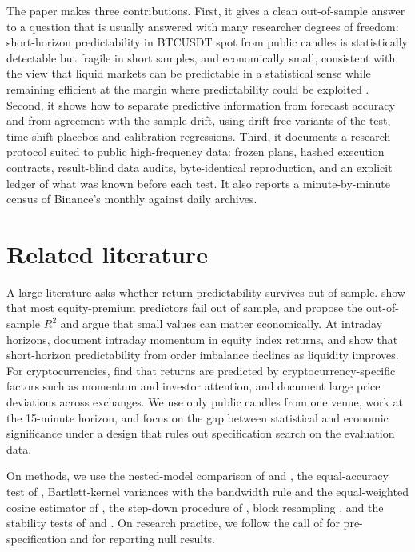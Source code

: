 \documentclass[11pt]{article}
\begin{document}
The paper makes three contributions. First, it gives a clean out-of-sample answer to a question that is usually answered with many researcher degrees of freedom: short-horizon predictability in BTCUSDT spot from public candles is statistically detectable but fragile in short samples, and economically small, consistent with the view that liquid markets can be predictable in a statistical sense while remaining efficient at the margin where predictability could be exploited \citep{chordia2008}. Second, it shows how to separate predictive information from forecast accuracy and from agreement with the sample drift, using drift-free variants of the test, time-shift placebos and calibration regressions. Third, it documents a research protocol suited to public high-frequency data: frozen plans, hashed execution contracts, result-blind data audits, byte-identical reproduction, and an explicit ledger of what was known before each test. It also reports a minute-by-minute census of Binance's monthly against daily archives.

\section{Related literature}

A large literature asks whether return predictability survives out of sample. \citet{welchgoyal2008} show that most equity-premium predictors fail out of sample, and \citet{campbellthompson2008} propose the out-of-sample $R^2$ and argue that small values can matter economically. At intraday horizons, \citet{gao2018} document intraday momentum in equity index returns, and \citet{chordia2008} show that short-horizon predictability from order imbalance declines as liquidity improves. For cryptocurrencies, \citet{liutsyvinski2021} find that returns are predicted by cryptocurrency-specific factors such as momentum and investor attention, and \citet{makarovschoar2020} document large price deviations across exchanges. We use only public candles from one venue, work at the 15-minute horizon, and focus on the gap between statistical and economic significance under a design that rules out specification search on the evaluation data.

On methods, we use the nested-model comparison of \citet{clarkwest2007} and \citet{clarkmccracken2001}, the equal-accuracy test of \citet{dieboldmariano1995}, Bartlett-kernel variances \citep{neweywest1987} with the bandwidth rule and the equal-weighted cosine estimator of \citet{lazarus2018}, the step-down procedure of \citet{holm1979}, block resampling \citep{kunsch1989}, and the stability tests of \citet{giacominiwhite2006} and \citet{giacominirossi2010}. On research practice, we follow the call of \citet{harvey2017} for pre-specification and for reporting null results.
\end{document}
